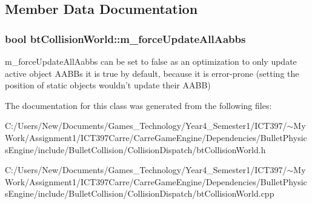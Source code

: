 \subsection{Member Data Documentation}
\hypertarget{classbt_collision_world_91b110fc2501b965cdcaa2a6e1d89999}{
\subsubsection[m\_\-forceUpdateAllAabbs]{\setlength{\rightskip}{0pt plus 5cm}bool {\bf btCollisionWorld::m\_\-forceUpdateAllAabbs}}}
\label{classbt_collision_world_91b110fc2501b965cdcaa2a6e1d89999}


m\_\-forceUpdateAllAabbs can be set to false as an optimization to only update active object AABBs it is true by default, because it is error-prone (setting the position of static objects wouldn't update their AABB) 

The documentation for this class was generated from the following files:\begin{CompactItemize}
\item 
C:/Users/New/Documents/Games\_\-Technology/Year4\_\-Semester1/ICT397/$\sim$My Work/Assignment1/ICT397Carre/CarreGameEngine/Dependencies/BulletPhysicsEngine/include/BulletCollision/CollisionDispatch/btCollisionWorld.h\item 
C:/Users/New/Documents/Games\_\-Technology/Year4\_\-Semester1/ICT397/$\sim$My Work/Assignment1/ICT397Carre/CarreGameEngine/Dependencies/BulletPhysicsEngine/include/BulletCollision/CollisionDispatch/btCollisionWorld.cpp\end{CompactItemize}
